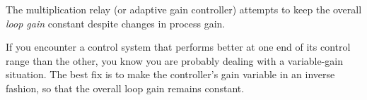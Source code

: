 The multiplication relay (or adaptive gain controller) attempts to keep the overall {\it loop gain} constant despite changes in process gain.







If you encounter a control system that performs better at one end of its control range than the other, you know you are probably dealing with a variable-gain situation.  The best fix is to make the controller's gain variable in an inverse fashion, so that the overall loop gain remains constant.




